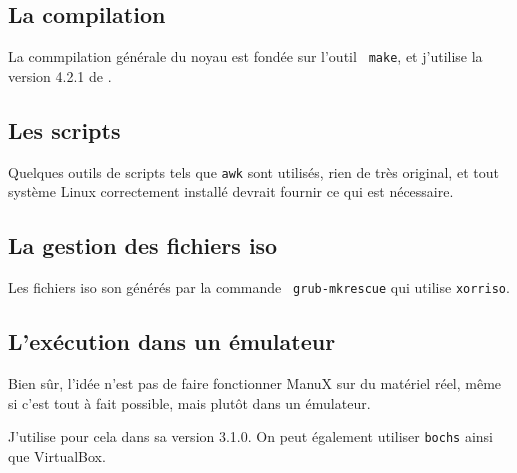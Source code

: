 %
\subsection{La compilation}

   La commpilation générale du noyau est fondée sur l'outil {\tt
make}, et j'utilise la version 4.2.1 de .

%
\subsection{Les scripts}

   Quelques outils de scripts tels que {\tt awk} sont utilisés, rien
de très original, et tout système Linux correctement installé devrait
fournir ce qui est nécessaire.

%
\subsection{La gestion des fichiers {\sc iso}}

   Les fichiers {\sc iso} son générés par la commande {\tt
     grub-mkrescue} qui utilise {\tt xorriso}.
   
%
\subsection{L'exécution dans un émulateur}

   Bien sûr, l'idée n'est pas de faire fonctionner ManuX sur du
matériel réel, même si c'est tout à fait possible, mais plutôt dans un
émulateur.

   J'utilise pour cela \qemu dans sa version 3.1.0. On peut
également utiliser {\tt bochs} ainsi que VirtualBox.
   
%
